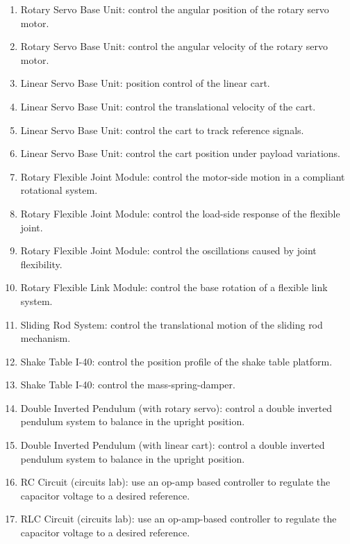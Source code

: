 \documentclass{ee122_notes}
\begin{document}
\begin{enumerate}
    \item Rotary Servo Base Unit: control the angular position of the rotary servo motor.

    \item Rotary Servo Base Unit: control the angular velocity of the rotary servo motor.
   
    \item Linear Servo Base Unit: position control of the linear cart.
    
    \item Linear Servo Base Unit: control the translational velocity of the cart.
        
    \item Linear Servo Base Unit: control the cart to track reference signals.
    
    \item Linear Servo Base Unit: control the cart position under payload variations.
  
    \item Rotary Flexible Joint Module: control the motor-side motion in a compliant rotational system.
        
    \item Rotary Flexible Joint Module: control the load-side response of the flexible joint.
        
    \item Rotary Flexible Joint Module: control the oscillations caused by joint flexibility.

    \item Rotary Flexible Link Module: control the base rotation of a flexible link system.

    \item Sliding Rod System: control the translational motion of the sliding rod mechanism.

    \item Shake Table I-40: control the position profile of the shake table platform.

    \item Shake Table I-40: control the mass-spring-damper.
    
    \item Double Inverted Pendulum (with rotary servo): control a double inverted pendulum system to balance in the upright position.
    
    \item Double Inverted Pendulum (with linear cart): control a double inverted pendulum system to balance in the upright position.

    \item RC Circuit (circuits lab): use an op-amp based controller to regulate the capacitor voltage to a desired reference.
   
    \item RLC Circuit (circuits lab): use an op-amp-based controller to regulate the capacitor voltage to a desired reference.

\end{enumerate}
\end{document}

